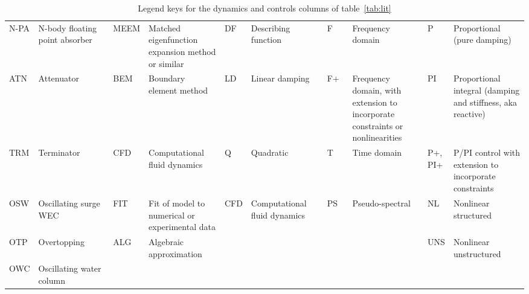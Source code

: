 \begin{landscape}
\begingroup
\begin{table}
    \centering
    \begin{tabular}{>{\centering\arraybackslash}p{0.05\linewidth}>{\raggedright\arraybackslash}p{0.15\linewidth}|>{\centering\arraybackslash}p{0.05\linewidth}>{\raggedright\arraybackslash}p{0.15\linewidth}|>{\centering\arraybackslash}p{0.05\linewidth}>{\raggedright\arraybackslash}p{0.15\linewidth}|>{\centering\arraybackslash}p{0.05\linewidth}>{\raggedright\arraybackslash}p{0.15\linewidth}|>{\centering\arraybackslash}p{0.05\linewidth}>{\raggedright\arraybackslash}p{0.15\linewidth}}
         \multicolumn{2}{c|}{Device}&  \multicolumn{2}{c|}{Hydro}&  \multicolumn{2}{c|}{Drag} &\multicolumn{2}{c|}{Domain} & \multicolumn{2}{c}{Controls} \\ \hline
         N-PA&  N-body floating point absorber&  MEEM&  Matched eigenfunction expansion method or similar &  DF& Describing function & F&Frequency domain & P&Proportional (pure damping) \\
         ATN&  Attenuator&  BEM&  Boundary element method&  LD& Linear damping & F+&Frequency domain, with extension to incorporate constraints or nonlinearities & PI&Proportional integral (damping and stiffness, aka reactive) \\
         TRM&  Terminator&  CFD&  Computational fluid dynamics&  Q& Quadratic & T&Time domain & P+, PI+&P/PI control with extension to incorporate constraints \\
         OSW&  Oscillating surge WEC&  FIT&  Fit of model to numerical or experimental data&  CFD& Computational fluid dynamics & PS&Pseudo-spectral& NL&Nonlinear structured \\
         OTP&  Overtopping&  ALG&  Algebraic approximation&  &  & & & UNS&Nonlinear unstructured \\
        OWC& Oscillating water column& & & & & & & & \\
    \end{tabular}
    \caption{Legend keys for the dynamics and controls columns of table~\ref{tab:lit}}
    \label{tab:lit-review-legend-dynam}
\end{table}
\endgroup
\end{landscape}

